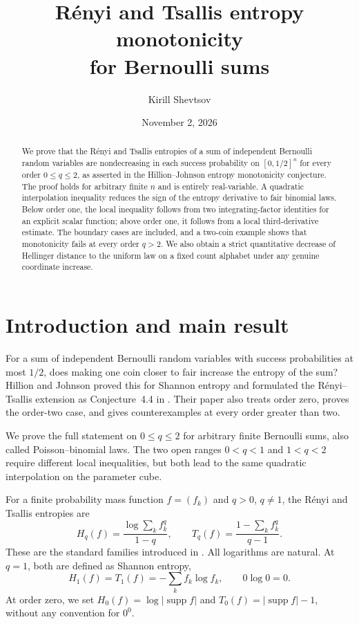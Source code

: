 \documentclass[11pt,a4paper]{amsart}
\title[Entropy monotonicity for Bernoulli sums]{R\'enyi and Tsallis entropy monotonicity\\for Bernoulli sums}
\author{Kirill Shevtsov}
\date{November 2, 2026}
\numberwithin{equation}{section}
\theoremstyle{remark}
\newcommand{\supp}{\operatorname{supp}}
\begin{document}
\begin{abstract}
We prove that the R\'enyi and Tsallis entropies of a sum of independent
Bernoulli random variables are nondecreasing in each success probability
on $[0,1/2]^n$ for every order $0\le q\le2$, as asserted in the
Hillion--Johnson entropy monotonicity conjecture. The proof holds for
arbitrary finite $n$ and is entirely real-variable. A quadratic
interpolation inequality reduces the sign of the entropy derivative
to fair binomial laws. Below order one, the local inequality follows
from two integrating-factor identities for an explicit scalar function;
above order one, it follows from a local third-derivative estimate.
The boundary cases are included, and a two-coin example shows that
monotonicity fails at every order $q>2$. We also obtain a strict
quantitative decrease of Hellinger distance to the uniform law on a
fixed count alphabet under any genuine coordinate increase.
\end{abstract}
\maketitle

\section{Introduction and main result}

For a sum of independent Bernoulli random variables with success
probabilities at most $1/2$, does making one coin closer to fair
increase the entropy of the sum? Hillion and Johnson proved this
for Shannon entropy and formulated the R\'enyi--Tsallis extension
as Conjecture~4.4 in \cite{HJ}. Their paper also treats order zero,
proves the order-two case, and gives counterexamples at every order
greater than two.

We prove the full statement on $0\le q\le2$ for arbitrary finite
Bernoulli sums, also called Poisson--binomial laws. The two open
ranges $0<q<1$ and $1<q<2$ require different local inequalities,
but both lead to the same quadratic interpolation on the parameter cube.

For a finite probability mass function $f=(f_k)$ and $q>0$, $q\ne1$,
the R\'enyi and Tsallis entropies are
\begin{equation}
 H_q(f)=\frac{\log\sum_k f_k^q}{1-q},\qquad
 T_q(f)=\frac{1-\sum_k f_k^q}{q-1}.
 \label{eq:entropies}
\end{equation}
These are the standard families introduced in \cite{Renyi,Tsallis}.
All logarithms are natural. At $q=1$, both are defined as Shannon
entropy,
\[
 H_1(f)=T_1(f)=-\sum_k f_k\log f_k,
 \qquad 0\log0=0.
\]
At order zero, we set $H_0(f)=\log|\supp f|$ and
$T_0(f)=|\supp f|-1$, without any convention for $0^0$.
\end{document}
